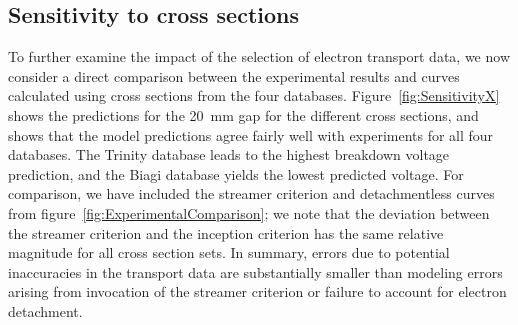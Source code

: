 \documentclass{iopjournal}
\begin{document}


\subsection{Sensitivity to cross sections}
\label{sec:SensitivityX}
To further examine the impact of the selection of electron transport data, we now consider a direct comparison between the experimental results and curves calculated using cross sections from the four databases.
Figure~\ref{fig:SensitivityX} shows the predictions for the \SI{20}{\milli\meter} gap for the different cross sections, and shows that the model predictions agree fairly well with experiments for all four databases.
The Trinity database \cite{trinity} leads to the highest breakdown voltage prediction, and the Biagi database \cite{biagi} yields the lowest predicted voltage.
For comparison, we have included the streamer criterion and detachmentless curves from figure~\ref{fig:ExperimentalComparison}; we note that the deviation between the streamer criterion and the inception criterion has the same relative magnitude for all cross section sets.
In summary, errors due to potential inaccuracies in the transport data are substantially smaller than modeling errors arising from invocation of the streamer criterion or failure to account for electron detachment.
\end{document}
